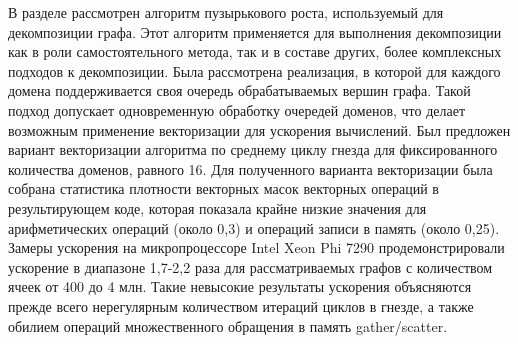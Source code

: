 В разделе рассмотрен алгоритм пузырькового роста, используемый для декомпозиции графа.
Этот алгоритм применяется для выполнения декомпозиции как в роли самостоятельного метода, так и в составе других, более комплексных подходов к декомпозиции.
Была рассмотрена реализация, в которой для каждого домена поддерживается своя очередь обрабатываемых вершин графа.
Такой подход допускает одновременную обработку очередей доменов, что делает возможным применение векторизации для ускорения вычислений.
Был предложен вариант векторизации алгоритма по среднему циклу гнезда для фиксированного количества доменов, равного 16.
Для полученного варианта векторизации была собрана статистика плотности векторных масок векторных операций в результирующем коде, которая показала крайне низкие значения для арифметических операций (около 0,3) и операций записи в память (около 0,25). 
Замеры ускорения на микропроцессоре Intel Xeon Phi 7290 продемонстрировали ускорение в диапазоне 1,7-2,2 раза для рассматриваемых графов с количеством ячеек от 400 до 4 млн.
Такие невысокие результаты ускорения объясняются прежде всего нерегулярным количеством итераций циклов в гнезде, а также обилием операций множественного обращения в память gather/scatter.
